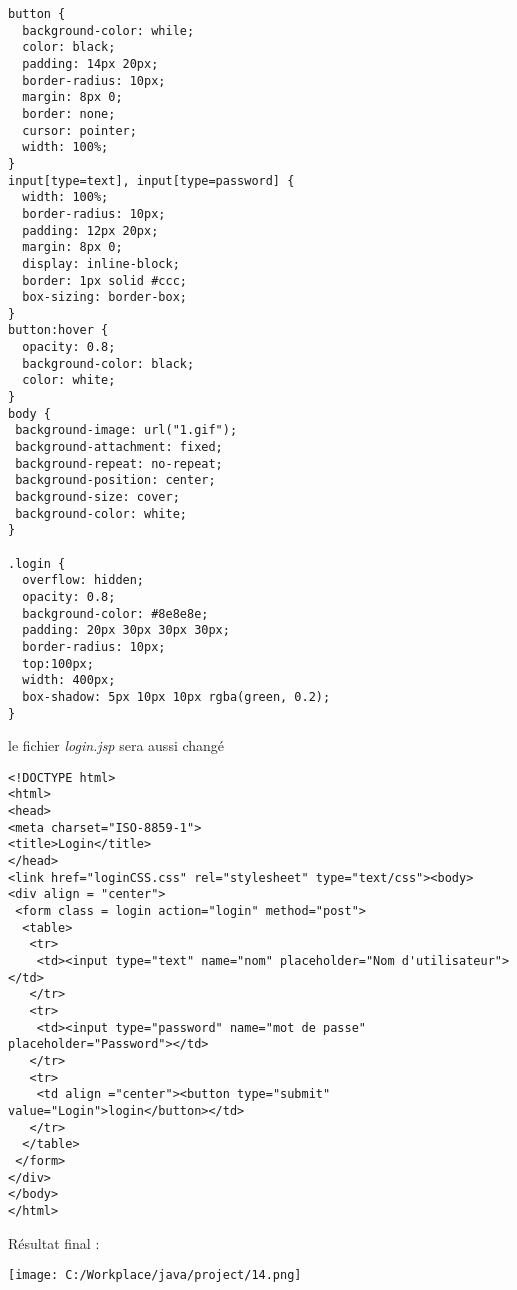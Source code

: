 \documentclass[12]{article}
\begin{document}
\begin{scriptsize}

\lstset{language=CSS}
\begin{lstlisting}
button {
  background-color: while;
  color: black;
  padding: 14px 20px;
  border-radius: 10px;
  margin: 8px 0;
  border: none;
  cursor: pointer;
  width: 100%;
}
input[type=text], input[type=password] {
  width: 100%;
  border-radius: 10px;
  padding: 12px 20px;
  margin: 8px 0;
  display: inline-block;
  border: 1px solid #ccc;
  box-sizing: border-box;
}
button:hover {
  opacity: 0.8;
  background-color: black;
  color: white;
}
body {
 background-image: url("1.gif");
 background-attachment: fixed;
 background-repeat: no-repeat;
 background-position: center;
 background-size: cover;
 background-color: white;
}

.login {
  overflow: hidden;
  opacity: 0.8;
  background-color: #8e8e8e;
  padding: 20px 30px 30px 30px;
  border-radius: 10px;
  top:100px;
  width: 400px;
  box-shadow: 5px 10px 10px rgba(green, 0.2);
}

\end{lstlisting}
\end{scriptsize}



le fichier \textit{login.jsp} sera aussi changé 


\lstset{language=XML}
\begin{scriptsize}
\begin{lstlisting}
<!DOCTYPE html>
<html>
<head>
<meta charset="ISO-8859-1">
<title>Login</title>
</head>
<link href="loginCSS.css" rel="stylesheet" type="text/css"><body>
<div align = "center">
 <form class = login action="login" method="post">
  <table>
   <tr>
    <td><input type="text" name="nom" placeholder="Nom d'utilisateur"></td>
   </tr>
   <tr>
    <td><input type="password" name="mot de passe" placeholder="Password"></td>
   </tr>
   <tr>
    <td align ="center"><button type="submit" value="Login">login</button></td>
   </tr>
  </table>
 </form>
</div>
</body>
</html>
\end{lstlisting}
\end{scriptsize}


Résultat final :

\begin{center}
\hspace*{-2cm}\texttt{[image: C:/Workplace/java/project/14.png]}
\end{center}
\end{document}

